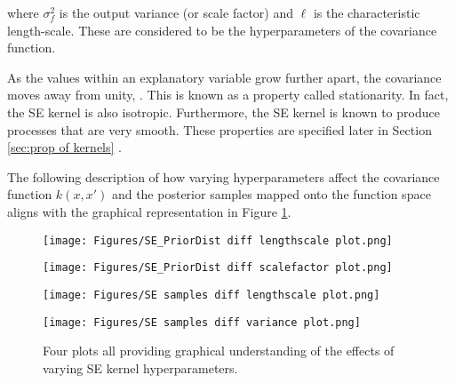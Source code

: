 \documentclass[12pt,a4paper]{article}
\begin{document}
where \( \sigma_f^2 \) is the output variance (or scale factor) and \( \ell \) is the characteristic length-scale. These are considered to be the hyperparameters of the covariance function.

As the values within an explanatory variable grow further apart, the covariance moves away from unity, \citep{williams2006gaussian}. This is known as a property called stationarity. In fact, the SE kernel is also isotropic. Furthermore, the SE kernel is known to produce processes that are very smooth. These properties are specified later in Section \ref{sec:prop of kernels} .

The following description of how varying hyperparameters affect the covariance function \(k(x,x')\) and the posterior samples mapped onto the function space aligns with the graphical representation in Figure \ref{fig:SE varying hyperparameter plots}. 

\begin{figure}[]
    \centering

    \begin{minipage}{0.45\textwidth}
        \centering
        \texttt{[image: Figures/SE\_PriorDist diff lengthscale plot.png]} %
        \label{fig:SE_PriorDist diff lengthscale plot}
    \end{minipage} 
    \begin{minipage}{0.45\textwidth}
        \centering
        \texttt{[image: Figures/SE\_PriorDist diff scalefactor plot.png]} %
        \label{fig:SE_PriorDist diff scalefactor plot}
    \end{minipage}

    \begin{minipage}{0.45\textwidth}
        \centering
        \texttt{[image: Figures/SE samples diff lengthscale plot.png]} %
        \label{fig:SE samples diff lengthscale plot}
    \end{minipage} 
    \begin{minipage}{0.45\textwidth}
        \centering
        \texttt{[image: Figures/SE samples diff variance plot.png]} %
        \label{fig:SE samples diff variance plot}
    \end{minipage}

    \caption{Four plots all providing graphical understanding of the effects of varying SE kernel hyperparameters.}
    \label{fig:SE varying hyperparameter plots}
\end{figure}
\end{document}
